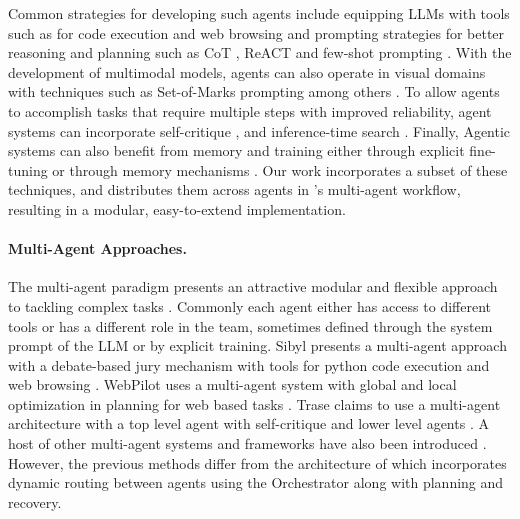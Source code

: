 Common strategies for developing such agents \cite{liu2024agent,xi2023risepotentiallargelanguage, masterman2024landscape, cheng2024exploring} include equipping LLMs with tools such as for code execution and web browsing \cite{qin2023tool,qin2023toolllm,schick-arxiv2023,mialon2023gaiabenchmarkgeneralai} and prompting strategies for better reasoning and planning such as CoT \cite{wei2022chain}, ReACT \cite{yao-iclr2023} and few-shot prompting \cite{zhou2024webarenarealisticwebenvironment}. With the development of multimodal models, agents can also operate in visual domains with techniques such as Set-of-Marks prompting \cite{yang2023set} among others \cite{yang2023set, zhang2024lookscreensmultimodalchainofaction,paranjape2023art,he2024webvoyagerbuildingendtoendweb}. To allow agents to accomplish tasks that require multiple steps with improved reliability, agent systems can incorporate self-critique \cite{wu2024oscopilotgeneralistcomputeragents,pan2024autonomousevaluationrefinementdigital,paul-etal-2024-refiner}, and inference-time search \cite{chen2024treesearchusefulllm,yao2023treethoughtsdeliberateproblem,koh2024treesearchlanguagemodel,song2024trialerrorexplorationbasedtrajectory}. Finally, Agentic systems can also benefit from memory and training either through explicit fine-tuning \cite{zeng2023agenttuningenablinggeneralizedagent,pan2024autonomousevaluationrefinementdigital,liu-arxiv2024,putta2024agentqadvancedreasoning} or through memory mechanisms \cite{wang2024agentworkflowmemory,sodhi2024stepstackedllmpolicies}.  Our work incorporates a subset of these techniques, and distributes them across agents in \team's multi-agent workflow, resulting in a modular, easy-to-extend implementation. 


\paragraph{Multi-Agent Approaches.} The multi-agent paradigm presents an attractive modular and flexible approach to tackling complex tasks \cite{MASaSurvey2000, Messing2002AnIT, Grosz1999SharedPlans,Tambe1998AgentTeams, Scerri2001AdjustableAI, wu2023autogen, talebirad2023multiagentcollaborationharnessingpower,guo2024large,liu2024agent,xi2023risepotentiallargelanguage,masterman2024landscape,cheng2024exploring}. Commonly each agent either has access to different tools or has a different role in the team, sometimes defined through the system prompt of the LLM or by explicit training. Sibyl presents a multi-agent approach with a debate-based jury mechanism with tools for python code execution and web browsing \cite{wang2024sibylsimpleeffectiveagent}. WebPilot uses a multi-agent system with global and local optimization  in planning for web based tasks \cite{zhang2024webpilotversatileautonomousmultiagent}. Trase claims to use a multi-agent architecture with a top level agent with self-critique and lower level agents \cite{redcell_trase_2024}.  A host of other multi-agent systems and frameworks have also been introduced \cite{li2023camel,liang-arxiv2023,du2023improving,babyagi,hong2023metagpt}. However, the previous methods differ from the architecture of \team which incorporates dynamic routing between agents using the Orchestrator along with planning and recovery. 




